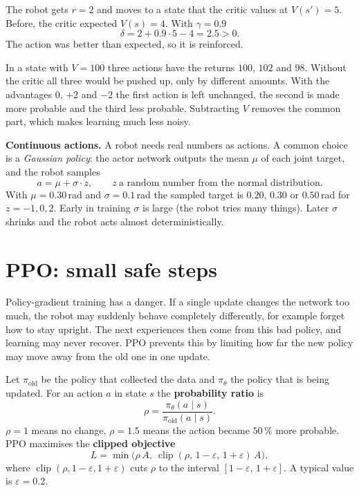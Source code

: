 \begin{example}
The robot gets $r=2$ and moves to a state that the critic values at $V(s')=5$. Before, the critic expected $V(s)=4$. With $\gamma=0.9$
\[
\delta=2+0.9\cdot5-4=2.5>0 .
\]
The action was better than expected, so it is reinforced.
\end{example}

\begin{example}
In a state with $V=100$ three actions have the returns $100$, $102$ and $98$. Without the critic all three would be pushed up, only by different amounts. With the advantages $0$, $+2$ and $-2$ the first action is left unchanged, the second is made more probable and the third less probable. Subtracting $V$ removes the common part, which makes learning much less noisy.
\end{example}

\textbf{Continuous actions.} A robot needs real numbers as actions. A common choice is a \emph{Gaussian policy}: the actor network outputs the mean $\mu$ of each joint target, and the robot samples
\[
a=\mu+\sigma\cdot z,\qquad z\ \text{a random number from the normal distribution.}
\]
With $\mu=0.30$\,rad and $\sigma=0.1$\,rad the sampled target is $0.20$, $0.30$ or $0.50$\,rad for $z=-1,0,2$. Early in training $\sigma$ is large (the robot tries many things). Later $\sigma$ shrinks and the robot acts almost deterministically.

\section*{PPO: small safe steps}
Policy-gradient training has a danger. If a single update changes the network too much, the robot may suddenly behave completely differently, for example forget how to stay upright. The next experiences then come from this bad policy, and learning may never recover. PPO prevents this by limiting how far the new policy may move away from the old one in one update.

Let $\pi_{\text{old}}$ be the policy that collected the data and $\pi_\theta$ the policy that is being updated. For an action $a$ in state $s$ the \textbf{probability ratio} is
\[
\rho=\frac{\pi_\theta(a\mid s)}{\pi_{\text{old}}(a\mid s)} .
\]
$\rho=1$ means no change, $\rho=1.5$ means the action became $50\,\%$ more probable. PPO maximises the \textbf{clipped objective}
\[
L=\min\bigl(\rho\,A,\ \operatorname{clip}(\rho,\,1-\varepsilon,\,1+\varepsilon)\,A\bigr),
\]
where $\operatorname{clip}(\rho,1-\varepsilon,1+\varepsilon)$ cuts $\rho$ to the interval $[1-\varepsilon,\,1+\varepsilon]$. A typical value is $\varepsilon=0.2$.

